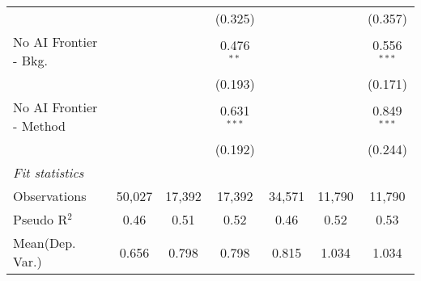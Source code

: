 \begin{tabular}{lcccccc}
                           &               &             & (0.325)       &             &         & (0.357)\\   
   No AI Frontier - Bkg.   &               &             & 0.476$^{**}$  &             &         & 0.556$^{***}$\\   
                           &               &             & (0.193)       &             &         & (0.171)\\   
   No AI Frontier - Method &               &             & 0.631$^{***}$ &             &         & 0.849$^{***}$\\   
                           &               &             & (0.192)       &             &         & (0.244)\\   
   \midrule
   \emph{Fit statistics}\\
   Observations            & 50,027        & 17,392      & 17,392        & 34,571      & 11,790  & 11,790\\  
   Pseudo R$^2$            & 0.46          & 0.51        & 0.52          & 0.46        & 0.52    & 0.53\\  
Mean(Dep. Var.) & 0.656 & 0.798 & 0.798 & 0.815 & 1.034 & 1.034 \\
   

\end{tabular}
